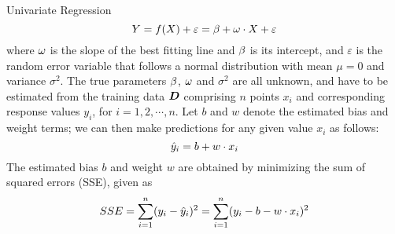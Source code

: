 \begin{frame}{Univariate Regression}
\begin{equation*}
    Y = f(X) + \varepsilon = \beta + \omega \cdot X + \varepsilon
\end{equation*}
where $\omega$ is the slope of the best fitting line and $\beta$ is its
intercept, and $\varepsilon$ is the random error variable that follows a
normal distribution with mean $\mu=0$ and variance $\sigma^2$. 
%
%
%
The true parameters $\beta$, $\omega$ and $\sigma^2$ are all unknown, and have to
be estimated from the training data ${\boldsymbol D}$ comprising $n$ points $x_i$
and corresponding response values $y_i$, for $i=1,2,\cdots,n$. Let
$b$ and $w$ denote the estimated bias and weight terms;
we can then make predictions for
any given value $x_i$ as follows:
\begin{equation*}
    \hat{y}_i =  b + w \cdot x_i
\end{equation*}
The estimated bias $b$ and weight $w$ are obtained 
by minimizing the sum of
squared errors (SSE), given as
\begin{align*}
    SSE = \sum_{i=1}^n (y_i - \hat{y}_i)^2 = \sum^{n}_{i=1} (y_i - b - w
    \cdot x_i)^2 
\end{align*}
\end{frame}
